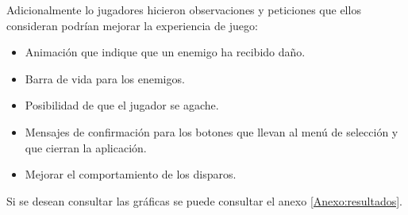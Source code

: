 Adicionalmente lo jugadores hicieron observaciones y peticiones que ellos
consideran podrían mejorar la experiencia de juego:
\begin{itemize}
        \item Animación que indique que un enemigo ha recibido daño.
        \item Barra de vida para los enemigos.
        \item Posibilidad de que el jugador se agache.
        \item Mensajes de confirmación para los botones que llevan al menú de selección 
        y que cierran la aplicación.
        \item Mejorar el comportamiento de los disparos.
\end{itemize}
Si se desean consultar las gráficas se puede consultar el anexo \ref{Anexo:resultados}.